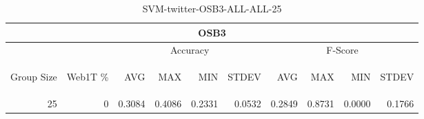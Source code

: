 \begin{center}
\begin{table}[htbp] 
 \begin{center}
\begin{tabular}{ | r | r | r | r | r | r | r | r | r | r |}
\hline
\multicolumn{10}{|c|}{OSB3}\\
\hline
 & & \multicolumn{4}{|c|}{Accuracy} & \multicolumn{4}{|c|}{F-Score}\\ \cline{3-10}
\begin{sideways}Group Size\end{sideways} & \begin{sideways}Web1T \%\end{sideways} & \begin{sideways}AVG\end{sideways} & \begin{sideways}MAX\end{sideways} & \begin{sideways}MIN\end{sideways} & \begin{sideways}STDEV\end{sideways} & \begin{sideways}AVG\end{sideways} & \begin{sideways}MAX\end{sideways} & \begin{sideways}MIN\end{sideways} & \begin{sideways}STDEV\end{sideways}\\
\hline
\multirow{0}{*}{25}
 & 0 & 0.3084 & 0.4086 & 0.2331 & 0.0532 & 0.2849 & 0.8731 & 0.0000 & 0.1766\\ \cline{2-10}
\hline
\end{tabular}
\caption{SVM-twitter-OSB3-ALL-ALL-25}
\label{table:SVM-twitter-OSB3-ALL-ALL-25}
\end{center}
 \end{table}
\end{center}

